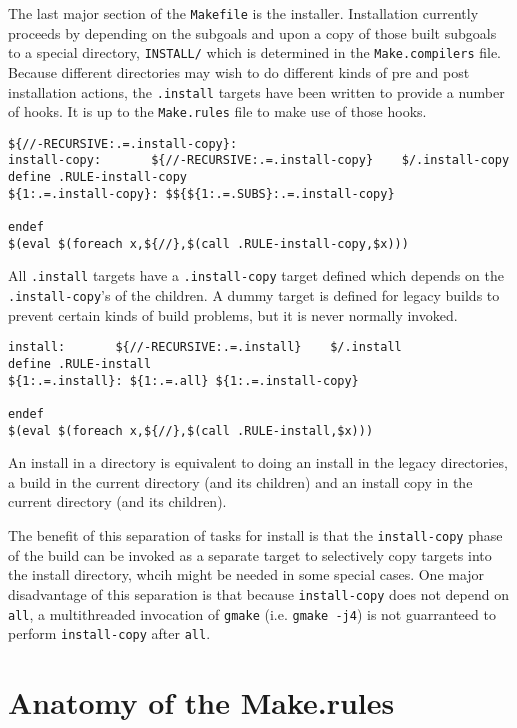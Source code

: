\documentclass[letterpaper]{article}
\begin{document}
The last major section of the \verb+Makefile+ is the installer.
Installation currently proceeds by depending on the subgoals
and upon a copy of those built subgoals to a special directory,
\verb+INSTALL/+ which is determined in the \verb+Make.compilers+
file.  Because different directories may wish to do different
kinds of pre and post installation actions, the \verb+.install+
targets have been written to provide a number of hooks.  It is
up to the \verb+Make.rules+ file to make use of those hooks.

\begin{verbatim}
${//-RECURSIVE:.=.install-copy}:
install-copy:       ${//-RECURSIVE:.=.install-copy}    $/.install-copy
define .RULE-install-copy
${1:.=.install-copy}: $${${1:.=.SUBS}:.=.install-copy}

endef
$(eval $(foreach x,${//},$(call .RULE-install-copy,$x)))
\end{verbatim}
All \verb+.install+ targets have a \verb+.install-copy+ target defined
which depends on the \verb+.install-copy+'s of the children.  A dummy
target is defined for legacy builds to prevent certain kinds of
build problems, but it is never normally invoked.

\begin{verbatim}
install:       ${//-RECURSIVE:.=.install}    $/.install
define .RULE-install
${1:.=.install}: ${1:.=.all} ${1:.=.install-copy}

endef
$(eval $(foreach x,${//},$(call .RULE-install,$x)))
\end{verbatim}
An install in a directory is equivalent to doing an install in
the legacy directories, a build in the current directory (and
its children) and an install copy in the current directory
(and its children).

The benefit of this separation of tasks for install is that
the \verb+install-copy+ phase of the build can be invoked as a
separate target to selectively copy targets into the install
directory, whcih might be needed in some special cases.  One
major disadvantage of this separation is that because \verb+install-copy+
does not depend on \verb+all+, a multithreaded invocation of
\verb+gmake+ (i.e. \verb+gmake -j4+) is not guarranteed to perform
\verb+install-copy+ after \verb+all+.

\section{Anatomy of the Make.rules}
\end{document}
